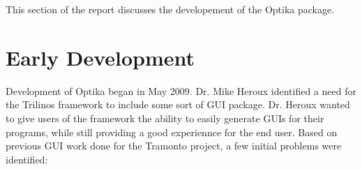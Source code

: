 This section of the report discusses the developement of the Optika package.

\section{Early Development}
Development of Optika began in May 2009. Dr. Mike Heroux identified a need for
the Trilinos framework to include some sort of GUI package. Dr. Heroux wanted 
to give users of the framework the ability to easily generate GUIs for their
programs, while still providing a good experiennce for the end user. Based on
previous GUI work done for the Tramonto project, a few initial problems were
identified:
	
